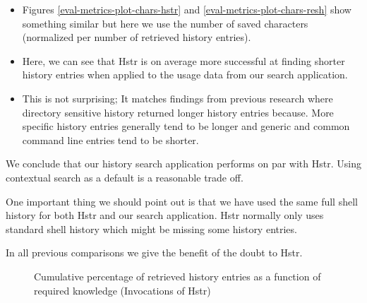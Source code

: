 \begin{itemize}
    \item Figures \ref{eval-metrics-plot-chars-hstr} and \ref{eval-metrics-plot-chars-resh} show something similar but here we use the number of saved characters (normalized per number of retrieved history entries). 
    \item Here, we can see that Hstr is on average more successful at finding shorter history entries when applied to the usage data from our search application.
    \item This is not surprising; It matches findings from previous research\cite{greenberg1993computer} where directory sensitive history returned longer history entries because. More specific history entries generally tend to be longer and generic and common command line entries tend to be shorter.
\end{itemize}

We conclude that our history search application performs on par with Hstr. Using contextual search as a default is a reasonable trade off.

One important thing we should point out is that we have used the same full shell history for both Hstr and our search application. Hstr normally only uses standard shell history which might be missing some history entries. 

In all previous comparisons we give the benefit of the doubt to Hstr. 

\clearpage
\begin{figure}[h!]
\centering
{}
\caption{Cumulative percentage of retrieved history entries as a function of required knowledge (Invocations of Hstr)}
\label{eval-metrics-plot-cmds-hstr}
\end{figure}

